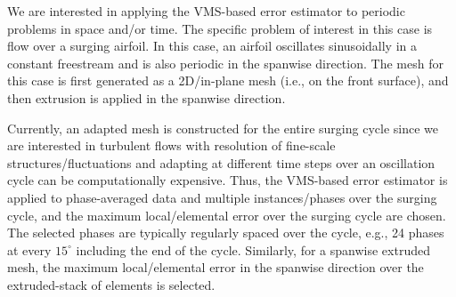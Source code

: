 We are interested in applying the VMS-based error estimator to periodic problems in space and/or time. The specific problem of interest in this case is flow over a surging airfoil. In this case, an airfoil oscillates sinusoidally in a constant freestream and is also periodic in the spanwise direction. The mesh for this case is first generated as a 2D/in-plane mesh (i.e., on the front surface), and then extrusion is applied in the spanwise direction.

Currently, an adapted mesh is constructed for the entire surging cycle since we are interested in turbulent flows with resolution of fine-scale structures/fluctuations and adapting at different time steps over an oscillation cycle can be computationally expensive. Thus, the VMS-based error estimator is applied to phase-averaged data and multiple instances/phases over the surging cycle, and the maximum local/elemental error over the surging cycle are chosen. The selected phases are typically regularly spaced over the cycle, e.g., 24 phases at every $15^\circ$ including the end of the cycle. Similarly, for a spanwise extruded mesh, the maximum local/elemental error in the spanwise direction over the extruded-stack of elements is selected.